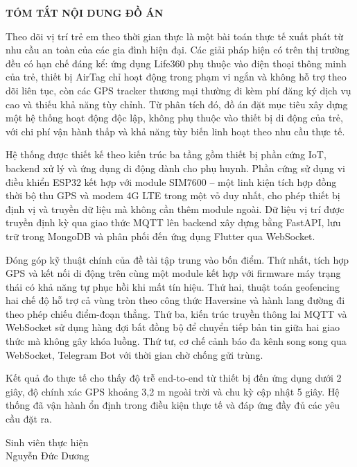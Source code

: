 \documentclass[../DoAn.tex]{subfiles}
\begin{document}
\begin{center}
    \Large{\textbf{TÓM TẮT NỘI DUNG ĐỒ ÁN}}\\
\end{center}
\vspace{1cm}

Theo dõi vị trí trẻ em theo thời gian thực là một bài toán thực tế xuất phát từ nhu cầu an toàn của các gia đình hiện đại. Các giải pháp hiện có trên thị trường đều có hạn chế đáng kể: ứng dụng Life360 phụ thuộc vào điện thoại thông minh của trẻ, thiết bị AirTag chỉ hoạt động trong phạm vi ngắn và không hỗ trợ theo dõi liên tục, còn các GPS tracker thương mại thường đi kèm phí đăng ký dịch vụ cao và thiếu khả năng tùy chỉnh. Từ phân tích đó, đồ án đặt mục tiêu xây dựng một hệ thống hoạt động độc lập, không phụ thuộc vào thiết bị di động của trẻ, với chi phí vận hành thấp và khả năng tùy biến linh hoạt theo nhu cầu thực tế.

Hệ thống được thiết kế theo kiến trúc ba tầng gồm thiết bị phần cứng IoT, backend xử lý và ứng dụng di động dành cho phụ huynh. Phần cứng sử dụng vi điều khiển ESP32 kết hợp với module SIM7600 -- một linh kiện tích hợp đồng thời bộ thu GPS và modem 4G LTE trong một vỏ duy nhất, cho phép thiết bị định vị và truyền dữ liệu mà không cần thêm module ngoài. Dữ liệu vị trí được truyền định kỳ qua giao thức MQTT lên backend xây dựng bằng FastAPI, lưu trữ trong MongoDB và phân phối đến ứng dụng Flutter qua WebSocket.

Đóng góp kỹ thuật chính của đề tài tập trung vào bốn điểm. Thứ nhất, tích hợp GPS và kết nối di động trên cùng một module kết hợp với firmware máy trạng thái có khả năng tự phục hồi khi mất tín hiệu. Thứ hai, thuật toán geofencing hai chế độ hỗ trợ cả vùng tròn theo công thức Haversine và hành lang đường đi theo phép chiếu điểm-đoạn thẳng. Thứ ba, kiến trúc truyền thông lai MQTT và WebSocket sử dụng hàng đợi bất đồng bộ để chuyển tiếp bản tin giữa hai giao thức mà không gây khóa luồng. Thứ tư, cơ chế cảnh báo đa kênh song song qua WebSocket, Telegram Bot với thời gian chờ chống gửi trùng.

Kết quả đo thực tế cho thấy độ trễ end-to-end từ thiết bị đến ứng dụng dưới 2 giây, độ chính xác GPS khoảng 3,2 m ngoài trời và chu kỳ cập nhật 5 giây. Hệ thống đã vận hành ổn định trong điều kiện thực tế và đáp ứng đầy đủ các yêu cầu đặt ra.

\begin{flushright}
Sinh viên thực hiện\\
\vspace{0.5cm}
Nguyễn Đức Dương
\end{flushright}
\end{document}
